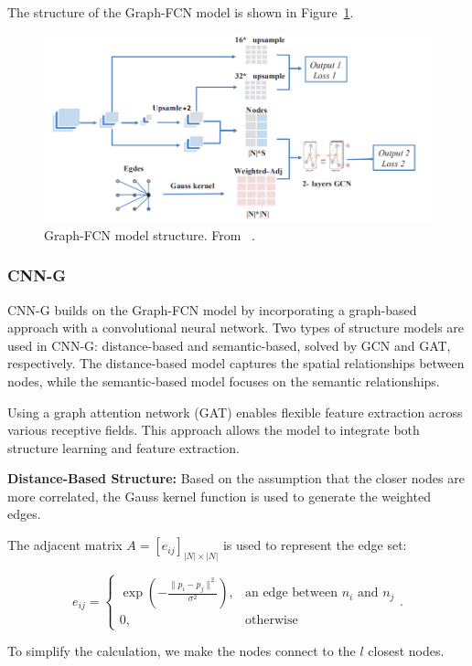 The structure of the Graph-FCN model is shown in Figure~\ref{fig:graphfcn_structure}.
\begin{figure}
    \centering
    \includegraphics[width=0.8\linewidth]{images/graphfcn_structure.png}
    \caption{Graph-FCN model structure. From ~\cite{lu2020graphfcnimagesemanticsegmentation}.}
    \label{fig:graphfcn_structure}
\end{figure}

\subsubsection{CNN-G}

CNN-G builds on the Graph-FCN model by incorporating a graph-based approach with a convolutional neural network. Two types of structure models are used in CNN-G: distance-based and semantic-based, solved by GCN and GAT, respectively. The distance-based model captures the spatial relationships between nodes, while the semantic-based model focuses on the semantic relationships.

Using a graph attention network (GAT) enables flexible feature extraction across various receptive fields. This approach allows the model to integrate both structure learning and feature extraction.

\textbf{Distance-Based Structure:} Based on the assumption that the closer nodes are more correlated, the Gauss kernel function is used to generate the weighted edges.

The adjacent matrix $A = [e_{ij}]_{|N| \times |N|}$ is used to represent the edge set:

\[
e_{ij} = \begin{cases} \exp \left( -\frac{\|p_i - p_j\|^2}{\sigma^2} \right), & \text{an edge between } n_i \text{ and } n_j \\ 0, & \text{otherwise} \end{cases}.
\]

To simplify the calculation, we make the nodes connect to the $l$ closest nodes.

